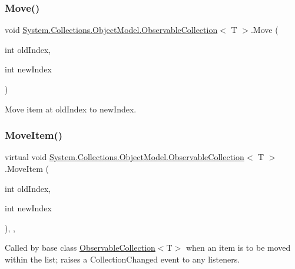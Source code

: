 \subsubsection{\texorpdfstring{Move()}{Move()}}
{\footnotesize\ttfamily void \hyperlink{class_system_1_1_collections_1_1_object_model_1_1_observable_collection}{System.\+Collections.\+Object\+Model.\+Observable\+Collection}$<$ T $>$.Move (\begin{DoxyParamCaption}\item[{int}]{old\+Index,  }\item[{int}]{new\+Index }\end{DoxyParamCaption})\hspace{0.3cm}{\ttfamily [inline]}}



Move item at old\+Index to new\+Index. 

\mbox{\label{class_system_1_1_collections_1_1_object_model_1_1_observable_collection_ae2777f92c49ec735601c43ef5f9e1179}} 
\subsubsection{\texorpdfstring{Move\+Item()}{MoveItem()}}
{\footnotesize\ttfamily virtual void \hyperlink{class_system_1_1_collections_1_1_object_model_1_1_observable_collection}{System.\+Collections.\+Object\+Model.\+Observable\+Collection}$<$ T $>$.Move\+Item (\begin{DoxyParamCaption}\item[{int}]{old\+Index,  }\item[{int}]{new\+Index }\end{DoxyParamCaption})\hspace{0.3cm}{\ttfamily [inline]}, {\ttfamily [protected]}, {\ttfamily [virtual]}}



Called by base class \hyperlink{class_system_1_1_collections_1_1_object_model_1_1_observable_collection}{Observable\+Collection}$<$T$>$ when an item is to be moved within the list; raises a Collection\+Changed event to any listeners. 

